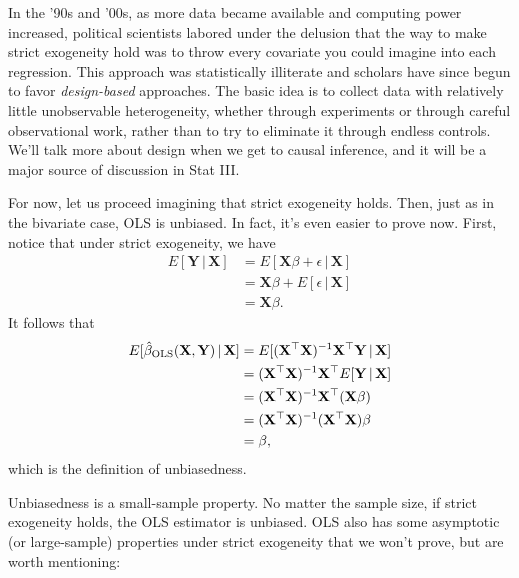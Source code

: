 \documentclass[12pt,oneside,openany]{book}
\begin{document}
In the '90s and '00s, as more data became available and computing power
increased, political scientists labored under the delusion that the way
to make strict exogeneity hold was to throw every covariate you could
imagine into each regression. This approach was statistically illiterate
\citep{clarke2005phantom} and scholars have since begun to favor
\emph{design-based} approaches. The basic idea is to collect data with
relatively little unobservable heterogeneity, whether through
experiments or through careful observational work, rather than to try to
eliminate it through endless controls. We'll talk more about design when
we get to causal inference, and it will be a major source of discussion
in Stat III.

For now, let us proceed imagining that strict exogeneity holds. Then,
just as in the bivariate case, OLS is unbiased. In fact, it's even
easier to prove now. First, notice that under strict exogeneity, we have
\[
\begin{aligned}
E[\mathbf{Y} \,|\, \mathbf{X}]
&= E[\mathbf{X} \beta + \epsilon \,|\, \mathbf{X}] \\
&= \mathbf{X} \beta + E[\epsilon \,|\, \mathbf{X}] \\
&= \mathbf{X} \beta.
\end{aligned}
\] It follows that \[
\begin{aligned}
E[\hat{\beta}_{\text{OLS}}(\mathbf{X}, \mathbf{Y}) \,|\, \mathbf{X}]
&= E[(\mathbf{X}^\top \mathbf{X})^{-1} \mathbf{X}^\top \mathbf{Y} \,|\, \mathbf{X}] \\
&= (\mathbf{X}^\top \mathbf{X})^{-1} \mathbf{X}^\top E[\mathbf{Y} \,|\, \mathbf{X}] \\
&= (\mathbf{X}^\top \mathbf{X})^{-1} \mathbf{X}^\top (\mathbf{X} \beta) \\
&= (\mathbf{X}^\top \mathbf{X})^{-1} (\mathbf{X}^\top \mathbf{X}) \beta \\
&= \beta,
\end{aligned}
\] which is the definition of unbiasedness.

Unbiasedness is a small-sample property. No matter the sample size, if
strict exogeneity holds, the OLS estimator is unbiased. OLS also has
some asymptotic (or large-sample) properties under strict exogeneity
that we won't prove, but are worth mentioning:
\end{document}
